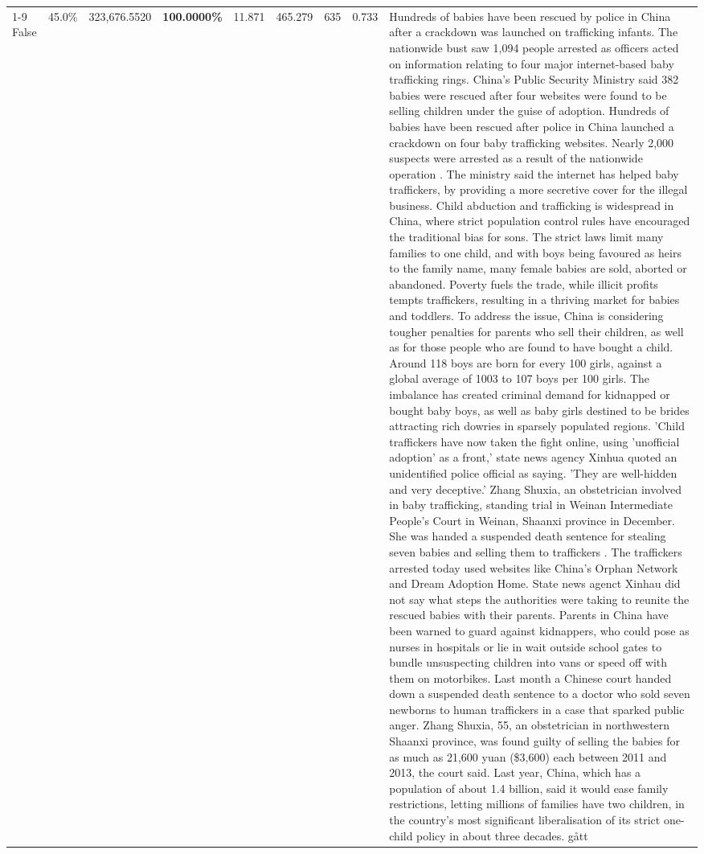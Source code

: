 \begin{table}[H]
\begin{tabular}{lllrlllll}
\cline{1-9}
False & 45.0\% & 323,676.5520 & \bfseries \color{red} 100.0000\% & 11.871 & 465.279 & 635 & 0.733 & Hundreds of babies have been rescued by police in China after a crackdown was launched on trafficking infants. The nationwide bust saw 1,094 people arrested as officers acted on information relating to four major internet-based baby trafficking rings. China's Public Security Ministry said 382 babies were rescued after four websites were found to be selling children under the guise of adoption. Hundreds of babies have been rescued after police in China launched a crackdown on four baby trafficking websites. Nearly 2,000 suspects were arrested as a result of the nationwide operation . The ministry said the internet has helped baby traffickers, by providing a more secretive cover for the illegal business. Child abduction and trafficking is widespread in China, where strict population control rules have encouraged the traditional bias for sons. The strict laws limit many families to one child, and with boys being favoured as heirs to the family name, many female babies are sold, aborted or abandoned. Poverty fuels the trade, while illicit profits tempts traffickers, resulting in a thriving market for babies and toddlers. To address the issue, China is considering tougher penalties for parents who sell their children, as well as for those people who are found to have bought a child. Around 118 boys are born for every 100 girls, against a global average of 1003 to 107 boys per 100 girls. The imbalance has created criminal demand for kidnapped or bought baby boys, as well as baby girls destined to be brides attracting rich dowries in sparsely populated regions. 'Child traffickers have now taken the fight online, using 'unofficial adoption' as a front,' state news agency Xinhua quoted an unidentified police official as saying. 'They are well-hidden and very deceptive.' Zhang Shuxia, an obstetrician involved in baby trafficking, standing trial in Weinan Intermediate People's Court in Weinan, Shaanxi province in December. She was handed a suspended death sentence for stealing seven babies and selling them to traffickers . The traffickers arrested today used websites like China's Orphan Network and Dream Adoption Home. State news agenct Xinhau did not say what steps the authorities were taking to reunite the rescued babies with their parents. Parents in China have been warned to guard against kidnappers, who could pose as nurses in hospitals or lie in wait outside school gates to bundle unsuspecting children into vans or speed off with them on motorbikes. Last month a Chinese court handed down a suspended death sentence to a doctor who sold seven newborns to human traffickers in a case that sparked public anger. Zhang Shuxia, 55, an obstetrician in northwestern Shaanxi province, was found guilty of selling the babies for as much as 21,600 yuan (\$3,600) each between 2011 and 2013, the court said. Last year, China, which has a population of about 1.4 billion, said it would ease family restrictions, letting millions of families have two children, in the country's most significant liberalisation of its strict one-child policy in about three decades. gått \\

\end{tabular}
\end{table}
